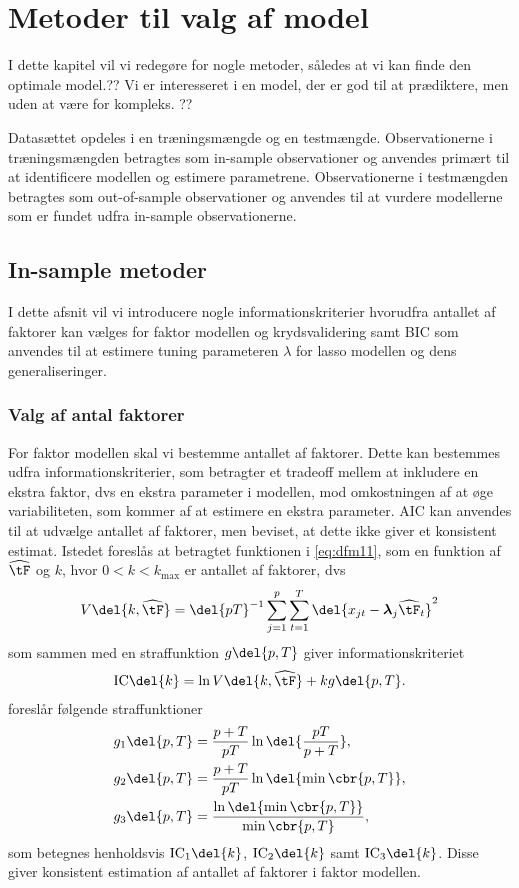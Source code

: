 \chapter{Metoder til valg af model}
I dette kapitel vil vi redegøre for nogle metoder, således at vi kan finde den optimale model.??
Vi er interesseret i en model, der er god til at prædiktere, men uden at være for kompleks.  ??

Datasættet opdeles i en træningsmængde og en testmængde. 
Observationerne i træningsmængden betragtes som in-sample observationer og anvendes primært til at identificere modellen og estimere parametrene. 
Observationerne i testmængden betragtes som out-of-sample observationer og anvendes til at vurdere modellerne som er fundet udfra in-sample observationerne. 
 
\section{In-sample metoder}
I dette afsnit vil vi introducere nogle informationskriterier hvorudfra antallet af faktorer kan vælges for faktor modellen og krydsvalidering samt BIC som anvendes til at estimere tuning parameteren \(\lambda\) for lasso modellen og dens generaliseringer.

\subsection{Valg af antal faktorer}
For faktor modellen skal vi bestemme antallet af faktorer.
Dette kan bestemmes udfra informationskriterier, som betragter et tradeoff mellem at inkludere en ekstra faktor, dvs en ekstra parameter i modellen, mod omkostningen af at øge variabiliteten, som kommer af at estimere en ekstra parameter.
AIC kan anvendes til at udvælge antallet af faktorer, men \citep{Bai_Ng} beviset, at dette ikke giver et konsistent estimat.
Istedet foreslås at betragtet funktionen i \eqref{eq:dfm11}, som en funktion af \(\widehat{\tF}\) og \(k\), hvor \(0<k<k_\text{max}\) er antallet af faktorer, dvs
\begin{align*}
V \del{k, \widehat{\tF}} = \del{p T}^{-1} \sum_{j=1}^p \sum_{t=1}^{T} \del{x_{jt} -\boldsymbol{\lambda}_j \widehat{\tF}_t}^2
\end{align*}
som sammen med en straffunktion \(g \del{p,T}\) giver informationskriteriet
\begin{align*}
\text{IC} \del{k} = \ln V \del{k, \widehat{\tF}} + k g \del{p,T}.
\end{align*}
\citep{Bai_Ng} foreslår følgende straffunktioner
\begin{align}
g_1 \del{p,T} &= \frac{p + T}{p T} \ln \del{\frac{p T}{p + T}}, \label{eq:ic1} \\
g_2 \del{p,T} &= \frac{p + T}{p T} \ln \del{ \min \cbr{p, T}}, \label{eq:ic2} \\
g_3 \del{p,T} &= \frac{\ln \del{\min \cbr{p, T}}}{\min \cbr{p, T}},\label{eq:ic3}
\end{align}
som betegnes henholdsvis \(\text{IC}_1 \del{k}\), \(\text{IC}_2 \del{k}\) samt \(\text{IC}_3 \del{k}\). Disse giver konsistent estimation af antallet af faktorer i faktor modellen.

